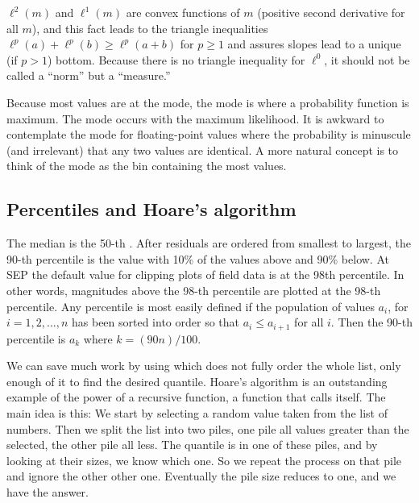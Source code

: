 \par
$\ell^2(m)$ and
$\ell^1(m)$ are convex functions of $m$ (positive second derivative for all $m$),
and this fact leads to
the triangle inequalities $\ell^p(a)+\ell^p(b) \ge \ell^p(a+b)$
for $p\ge 1$
and assures slopes lead to a unique (if $p>1$) bottom.
Because there is no triangle inequality for $\ell^0$,
it should not be called a ``norm'' but a ``measure.''

\par
Because most values are at the mode,
the mode is where a probability function is maximum.
The mode occurs with the maximum likelihood.
It is awkward to contemplate the mode for floating-point values
where the probability is minuscule (and irrelevant)
that any two values are identical.
A more natural concept is to think of the mode
as the bin containing the most values.


\subsection{Percentiles and Hoare's algorithm}
\par
The median is the 50-th .
After residuals are ordered from smallest to largest,
the 90-th percentile is the value with 10\% of the values
above and 90\% below.
At SEP the default value for clipping plots of field data
is at the 98th percentile.
In other words, magnitudes above the 98-th percentile
are plotted at the 98-th percentile.
Any percentile is most easily defined if the population
of values $a_i$, for $i=1,2,...,n$
has been sorted into order so that $a_i \le a_{i+1}$ for all $i$.
Then the 90-th percentile is $a_k$ where $k=(90n)/100$.

\par
We can save much work by using 
which does not fully order the whole list,
only enough of it to find the desired quantile.
Hoare's algorithm is an outstanding example
of the power of a recursive function, a function that calls itself.
The main idea is this:
We start by selecting a random value
taken from the list of numbers.
Then we split the list into two piles,
one pile all values greater than the selected,
the other pile all less.
The quantile is in one of these piles, and by looking
at their sizes, we know which one.
So we repeat the process on that pile
and ignore the other other one.
Eventually the pile size reduces to one, and we have the answer.

